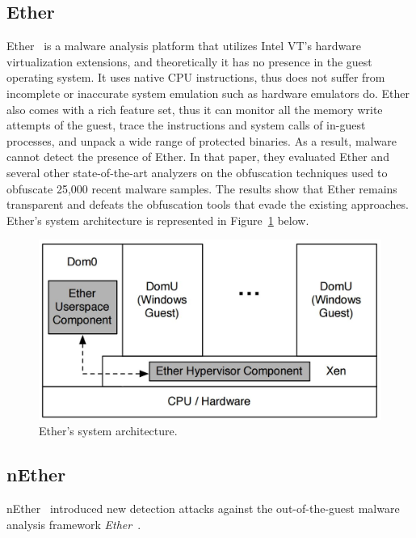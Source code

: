 \subsection{Ether}
Ether~\cite{ether} is a malware analysis platform that utilizes Intel VT's hardware virtualization extensions, and theoretically it has no presence in the guest operating system. It uses native CPU instructions, thus does not suffer from incomplete or inaccurate system emulation such as hardware emulators do. Ether also comes with a rich feature set, thus it can monitor all the memory write attempts of the guest, trace the instructions and system calls of in-guest processes, and unpack a wide range of protected binaries. As a result, malware cannot detect the presence of Ether. In that paper, they evaluated Ether and several other state-of-the-art analyzers on the obfuscation techniques used to obfuscate 25,000 recent malware samples. The results show that Ether remains transparent and defeats the obfuscation tools that evade the existing approaches. Ether's system architecture is represented in Figure~\ref{fig:ether} below.

\begin{figure}[!h]
	\centering
	\includegraphics[width=\linewidth]{figure/ether.png}
	\caption{Ether's system architecture.}
	\label{fig:ether}
\end{figure}

\subsection{nEther}
nEther~\cite{nether} introduced new detection attacks against the out-of-the-guest malware analysis framework \textit{Ether}~\cite{ether}.

